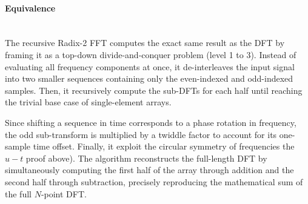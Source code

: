 \documentclass{article}
\begin{document}
\paragraph{Equivalence}~{}\\
The recursive Radix-2 FFT computes the exact same result as the DFT by framing it as a top-down divide-and-conquer problem (level 1 to 3). Instead of evaluating all frequency components at once, it de-interleaves the input signal into two smaller sequences containing only the even-indexed and odd-indexed samples. Then, it recursively compute the sub-DFTs for each half until reaching the trivial base case of single-element arrays. 

Since shifting a sequence in time corresponds to a phase rotation in frequency, the odd sub-transform is multiplied by a twiddle factor to account for its one-sample time offset. Finally, it exploit the circular symmetry of frequencies the $u-t$ proof above). The algorithm reconstructs the full-length DFT by simultaneously computing the first half of the array through addition and the second half through subtraction, precisely reproducing the mathematical sum of the full $N$-point DFT.
\end{document}
